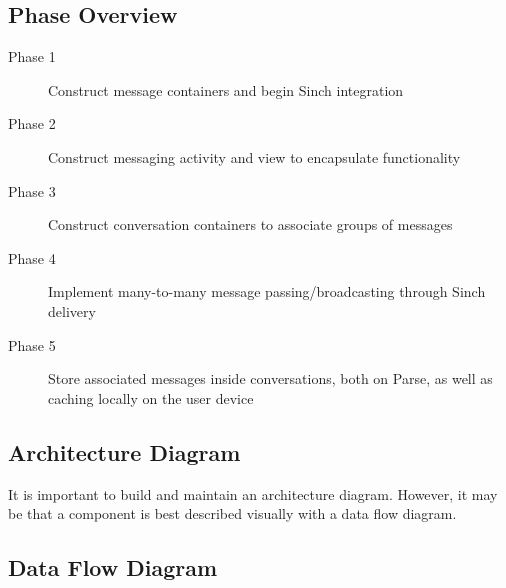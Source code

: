 \subsection{Phase Overview}


\begin{description}
  \item [Phase 1] Construct message containers and begin Sinch integration
  \item [Phase 2] Construct messaging activity and view to encapsulate functionality
  \item [Phase 3] Construct conversation containers to associate groups of messages
  \item [Phase 4] Implement many-to-many message passing/broadcasting through Sinch delivery
  \item [Phase 5] Store associated messages inside conversations, both on Parse, as well as caching locally on the user device
\end{description}

\subsection{Architecture Diagram}
It is important to build and maintain an architecture diagram.  However, it may 
be that a component is best described visually with a data flow diagram. 

\subsection{Data Flow Diagram}

